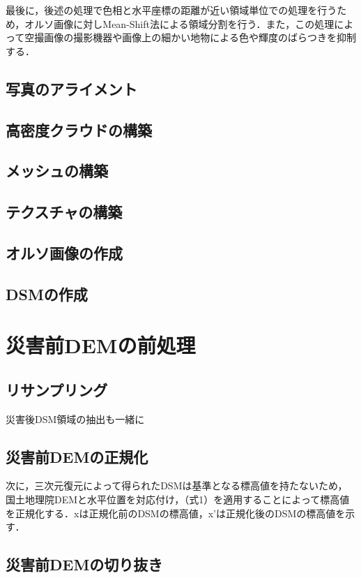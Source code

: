     最後に，後述の処理で色相と水平座標の距離が近い領域単位での処理を行うため，オルソ画像に対しMean-Shift法\cite{論文手法2}による領域分割を行う．また，この処理によって空撮画像の撮影機器や画像上の細かい地物による色や輝度のばらつきを抑制する．


    \subsection{写真のアライメント}
    \subsection{高密度クラウドの構築}
    \subsection{メッシュの構築}
    \subsection{テクスチャの構築}
    \subsection{オルソ画像の作成}
      \label{オルソ画像}
    \subsection{DSMの作成}




  \section{災害前DEMの前処理}
    \subsection{リサンプリング}
      災害後DSM領域の抽出も一緒に

    \subsection{災害前DEMの正規化}
      次に，三次元復元によって得られたDSMは基準となる標高値を持たないため，国土地理院DEMと水平位置を対応付け，（式1）を適用することによって標高値を正規化する．xは正規化前のDSMの標高値，x’は正規化後のDSMの標高値を示す．
  
    \subsection{災害前DEMの切り抜き}

